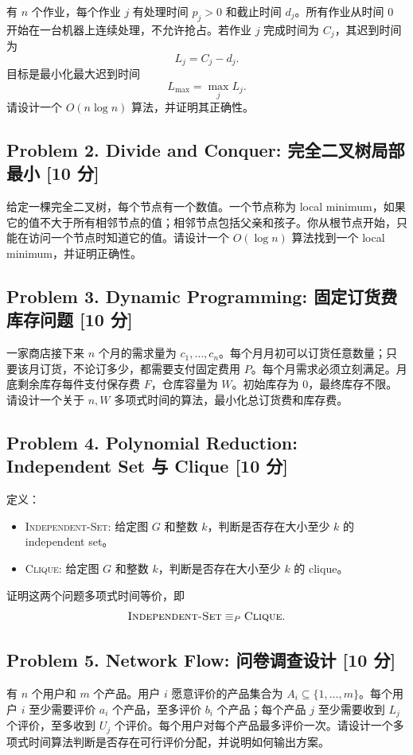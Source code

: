 \documentclass[UTF8,a4paper,11pt]{ctexart}
\newcommand{\points}[1]{\hfill{\small\textbf{[#1 分]}}}
\begin{document}
有 $n$ 个作业，每个作业 $j$ 有处理时间 $p_j>0$ 和截止时间 $d_j$。所有作业从时间 $0$ 开始在一台机器上连续处理，不允许抢占。若作业 $j$ 完成时间为 $C_j$，其迟到时间为
\[
L_j=C_j-d_j.
\]
目标是最小化最大迟到时间
\[
L_{\max}=\max_j L_j.
\]
请设计一个 $O(n\log n)$ 算法，并证明其正确性。

\subsection*{Problem 2. Divide and Conquer: 完全二叉树局部最小 \points{10}}

给定一棵完全二叉树，每个节点有一个数值。一个节点称为 local minimum，如果它的值不大于所有相邻节点的值；相邻节点包括父亲和孩子。你从根节点开始，只能在访问一个节点时知道它的值。请设计一个 $O(\log n)$ 算法找到一个 local minimum，并证明正确性。

\subsection*{Problem 3. Dynamic Programming: 固定订货费库存问题 \points{10}}

一家商店接下来 $n$ 个月的需求量为 $c_1,\ldots,c_n$。每个月月初可以订货任意数量；只要该月订货，不论订多少，都需要支付固定费用 $P$。每个月需求必须立刻满足。月底剩余库存每件支付保存费 $F$，仓库容量为 $W$。初始库存为 $0$，最终库存不限。请设计一个关于 $n,W$ 多项式时间的算法，最小化总订货费和库存费。

\subsection*{Problem 4. Polynomial Reduction: Independent Set 与 Clique \points{10}}

定义：
\begin{itemize}
  \item \textsc{Independent-Set}: 给定图 $G$ 和整数 $k$，判断是否存在大小至少 $k$ 的 independent set。
  \item \textsc{Clique}: 给定图 $G$ 和整数 $k$，判断是否存在大小至少 $k$ 的 clique。
\end{itemize}
证明这两个问题多项式时间等价，即
\[
\textsc{Independent-Set}\equiv_P\textsc{Clique}.
\]

\subsection*{Problem 5. Network Flow: 问卷调查设计 \points{10}}

有 $n$ 个用户和 $m$ 个产品。用户 $i$ 愿意评价的产品集合为 $A_i\subseteq\{1,\ldots,m\}$。每个用户 $i$ 至少需要评价 $a_i$ 个产品，至多评价 $b_i$ 个产品；每个产品 $j$ 至少需要收到 $L_j$ 个评价，至多收到 $U_j$ 个评价。每个用户对每个产品最多评价一次。请设计一个多项式时间算法判断是否存在可行评价分配，并说明如何输出方案。
\end{document}
